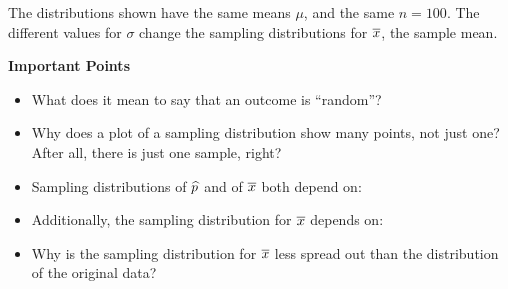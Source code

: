  The distributions shown have the same means $\mu$, and the same $n =
 100$. The different values for $\sigma$ change the sampling
 distributions for $\overline{x}$, the sample mean.  



 

{\bf Important Points}
\begin{itemize}
\item What does it mean to say that an outcome is ``random''?\vfill
\item Why does a plot of a sampling distribution show many points, not
  just one? After all, there is just one sample, right?\vfill
\item Sampling distributions of $\widehat{p}$ and of $\overline{x}$ both depend on:
  \vfill
\item Additionally, the sampling distribution for $\overline{x}$ depends
  on:\vfill
\item Why is the sampling distribution for $\overline{x}$ less spread out
  than the distribution of the original data?
\end{itemize}



